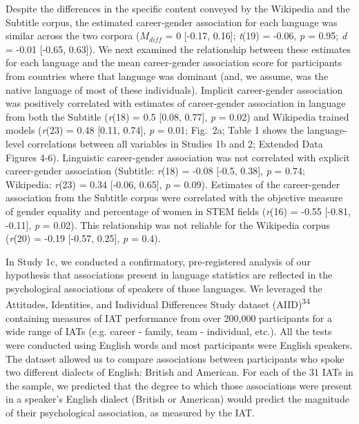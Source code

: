 \documentclass[11pt]{wlscirep}
\begin{document}
Despite the differences in the specific content conveyed by the
Wikipedia and the Subtitle corpus, the estimated career-gender association for each
language was similar across the two corpora ($M_{diff}$ = 0 {[}-0.17, 0.16{]}; \emph{t}(19) = -0.06, \emph{p} = 0.95; \emph{d} = -0.01 {[}-0.65, 0.63{]}). We next examined the relationship between these
estimates for each language and the mean career-gender association score
for participants from countries where that language was dominant (and,
we assume, was the native language of most of these individuals).
Implicit career-gender association was positively correlated with estimates of
 career-gender association in language from both the Subtitle (\emph{r}(18) = 0.5 {[}0.08, 0.77{]}, \emph{p} = 0.02)
and Wikipedia trained models (\emph{r}(23) = 0.48 {[}0.11, 0.74{]}, \emph{p} = 0.01; Fig.\ 2a;
Table 1 shows the language-level correlations between all variables in
Studies 1b and 2;  Extended Data Figures 4-6). Linguistic career-gender association was
not correlated with explicit career-gender association (Subtitle: \emph{r}(18) = -0.08 {[}-0.5, 0.38{]}, \emph{p} = 0.74; Wikipedia: \emph{r}(23) = 0.34 {[}-0.06, 0.65{]}, \emph{p} = 0.09). Estimates
of the career-gender association from the Subtitle corpus were correlated with the
objective measure of gender equality and percentage of women in STEM fields
(\emph{r}(16) = -0.55 {[}-0.81, -0.11{]}, \emph{p} = 0.02). This relationship was not reliable
for the Wikipedia corpus (\emph{r}(20) = -0.19 {[}-0.57, 0.25{]}, \emph{p} = 0.4).




In Study 1c, we conducted a confirmatory, pre-registered analysis of our hypothesis that associations present in language statistics are reflected in the psychological associations of speakers of those languages. We leveraged the Attitudes, Identities, and Individual Differences Study dataset (AIID)\textsuperscript{34} containing measures of IAT performance from over 200,000 participants for a wide range of IATs (e.g. career - family, team - individual, etc.). All the tests were conducted using English words and most participants were English speakers. The dataset allowed us to compare associations between participants who spoke two different dialects of English: British and American. For each of the 31 IATs in the sample, we predicted that the degree to which those associations were present in a speaker’s English dialect (British or American) would predict the magnitude of their psychological association, as measured by the IAT.
\end{document}
